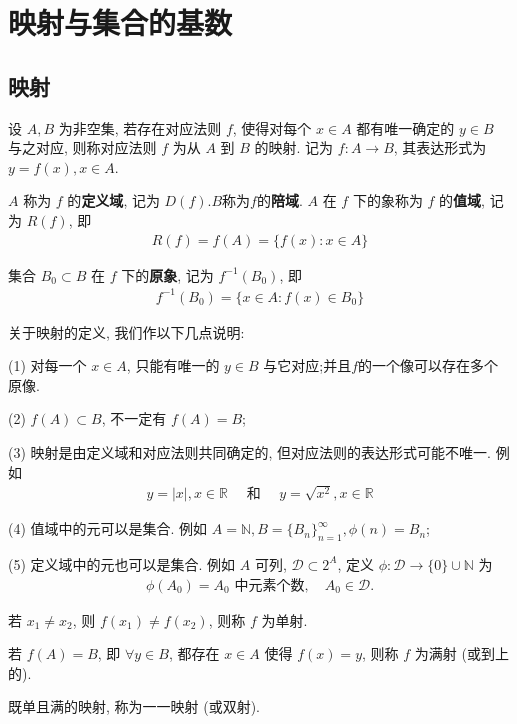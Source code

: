 \documentclass[../../main.tex]{subfiles}
\begin{document}
\section{映射与集合的基数}

\subsection{映射}

\begin{definition}[映射]
设 $A, B$ 为非空集, 若存在对应法则 $f$, 使得对每个 $x \in A$ 都有唯一确定的 $y \in B$ 与之对应, 则称对应法则 $f$ 为从 $A$ 到 $B$ 的映射. 记为 $f : A \to B$, 其表达形式为 $y = f(x), x \in A$.

$A$ 称为 $f$ 的\textbf{定义域}, 记为 $D(f)$.$B$称为$f$的\textbf{陪域}.
$A$ 在 $f$ 下的象称为 $f$ 的\textbf{值域}, 记为 $R(f)$, 即
\begin{align*}
R(f) = f(A) = \{f(x) : x \in A\}
\end{align*}

集合 $B_0 \subset B$ 在 $f$ 下的\textbf{原象}, 记为 $f^{-1}(B_0)$, 即
\begin{align*}
f^{-1}(B_0) = \{x \in A : f(x) \in B_0\}
\end{align*}
\end{definition}
\begin{remark}
关于映射的定义, 我们作以下几点说明:

(1) 对每一个 $x \in A$, 只能有唯一的 $y \in B$ 与它对应;并且$f$的一个像可以存在多个原像.

(2) $f(A) \subset B$, 不一定有 $f(A) = B$;

(3) 映射是由定义域和对应法则共同确定的, 但对应法则的表达形式可能不唯一. 例如
\begin{align*}
y = |x|, x \in \mathbb{R} \quad \text{ 和 } \quad y = \sqrt{x^2}, x \in \mathbb{R}
\end{align*}

(4) 值域中的元可以是集合. 例如 $A = \mathbb{N}, B = \{B_n\}_{n = 1}^{\infty}, \phi(n) = B_n$;

(5) 定义域中的元也可以是集合. 例如 $A$ 可列, $\mathcal{D} \subset 2^A$, 定义 $\phi : \mathcal{D} \to \{0\} \cup \mathbb{N}$ 为
\begin{align*}
\phi(A_0) = A_0 \text{ 中元素个数}, \quad A_0 \in \mathcal{D}.
\end{align*} 
\end{remark}

\begin{definition}[单射、满射和双射]
若 $x_1 \neq x_2$, 则 $f(x_1) \neq f(x_2)$, 则称 $f$ 为单射.

若 $f(A) = B$, 即 $\forall y \in B$, 都存在 $x \in A$ 使得 $f(x) = y$, 则称 $f$ 为满射 (或到上的).

既单且满的映射, 称为一一映射 (或双射).
\end{definition}
\end{document}
